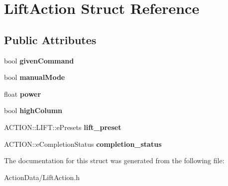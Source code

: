 \hypertarget{struct_lift_action}{
\section{\-Lift\-Action \-Struct \-Reference}
\label{struct_lift_action}
}
\subsection*{\-Public \-Attributes}
\begin{DoxyCompactItemize}
\item 
\hypertarget{struct_lift_action_a7bf40359495b177b72ad32c14f994c44}{
bool {\bfseries given\-Command}}
\label{struct_lift_action_a7bf40359495b177b72ad32c14f994c44}

\item 
\hypertarget{struct_lift_action_a95de8e893b153f57fa762b7135818415}{
bool {\bfseries manual\-Mode}}
\label{struct_lift_action_a95de8e893b153f57fa762b7135818415}

\item 
\hypertarget{struct_lift_action_a5eabcd20ba4e469f4ee975440ff3ee77}{
float {\bfseries power}}
\label{struct_lift_action_a5eabcd20ba4e469f4ee975440ff3ee77}

\item 
\hypertarget{struct_lift_action_abf5f34c9c7401a028aa462d0ae419875}{
bool {\bfseries high\-Column}}
\label{struct_lift_action_abf5f34c9c7401a028aa462d0ae419875}

\item 
\hypertarget{struct_lift_action_a050b364c4715a4c121de37414a34fd6d}{
\-A\-C\-T\-I\-O\-N\-::\-L\-I\-F\-T\-::e\-Presets {\bfseries lift\-\_\-preset}}
\label{struct_lift_action_a050b364c4715a4c121de37414a34fd6d}

\item 
\hypertarget{struct_lift_action_a89723d3b43c868d532c3f501b5c6822f}{
\-A\-C\-T\-I\-O\-N\-::e\-Completion\-Status {\bfseries completion\-\_\-status}}
\label{struct_lift_action_a89723d3b43c868d532c3f501b5c6822f}

\end{DoxyCompactItemize}


\-The documentation for this struct was generated from the following file\-:\begin{DoxyCompactItemize}
\item 
\-Action\-Data/\-Lift\-Action.\-h\end{DoxyCompactItemize}
